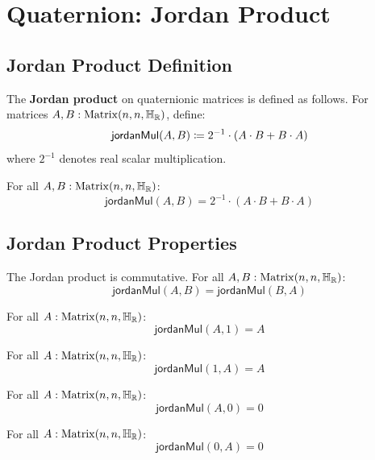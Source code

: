 \section{Quaternion: Jordan Product}

\subsection{Jordan Product Definition}

\begin{definition}[jordanMul]
The \textbf{Jordan product} on quaternionic matrices is defined as follows. For matrices $A, B : \mathrm{Matrix}(n, n, \mathbb{H}_{\mathbb{R}})$, define:
\[ \mathsf{jordanMul}(A, B) \coloneqq 2^{-1} \cdot (A \cdot B + B \cdot A) \]
where $2^{-1}$ denotes real scalar multiplication.
\end{definition}

\begin{lemma}
For all $A, B : \mathrm{Matrix}(n, n, \mathbb{H}_{\mathbb{R}})$:
\[ \mathsf{jordanMul}(A, B) = 2^{-1} \cdot (A \cdot B + B \cdot A) \]
\end{lemma}

\subsection{Jordan Product Properties}

\begin{theorem}
The Jordan product is commutative. For all $A, B : \mathrm{Matrix}(n, n, \mathbb{H}_{\mathbb{R}})$:
\[ \mathsf{jordanMul}(A, B) = \mathsf{jordanMul}(B, A) \]
\end{theorem}

\begin{theorem}
For all $A : \mathrm{Matrix}(n, n, \mathbb{H}_{\mathbb{R}})$:
\[ \mathsf{jordanMul}(A, 1) = A \]
\end{theorem}

\begin{theorem}
For all $A : \mathrm{Matrix}(n, n, \mathbb{H}_{\mathbb{R}})$:
\[ \mathsf{jordanMul}(1, A) = A \]
\end{theorem}

\begin{theorem}
For all $A : \mathrm{Matrix}(n, n, \mathbb{H}_{\mathbb{R}})$:
\[ \mathsf{jordanMul}(A, 0) = 0 \]
\end{theorem}

\begin{theorem}
For all $A : \mathrm{Matrix}(n, n, \mathbb{H}_{\mathbb{R}})$:
\[ \mathsf{jordanMul}(0, A) = 0 \]
\end{theorem}


